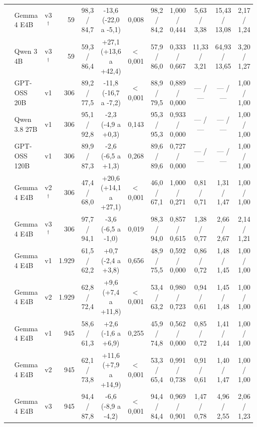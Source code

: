 \begin{table}[htbp!]
{\begin{tabular}{|l|l|c|r|c|c|c|c|c|c|c|c|}
 & Gemma 4 E4B & v3$^\dagger$ & 59 & 98,3 / 84,7 & -13,6 (-22,0 a -5,1) & 0,008 & 98,2 / 84,2 & 1,000 / 0,444 & 5,63 / 3,38 & 15,43 / 13,08 & 2,17 / 1,24 \\
 & Qwen 3 4B & v3$^\dagger$ & 59 & 59,3 / 86,4 & +27,1 (+13,6 a +42,4) & $<$\,0,001 & 57,9 / 86,0 & 0,333 / 0,667 & 11,33 / 3,21 & 64,93 / 13,65 & 3,20 / 1,27 \\
\hline
{} & GPT-OSS 20B & v1 & 306 & 89,2 / 77,5 & -11,8 (-16,7 a -7,2) & $<$\,0,001 & 88,9 / 79,5 & 0,889 / 0,000 & --- / --- & --- / --- & 1,00 / 1,00 \\
 & Qwen 3.8 27B & v1 & 306 & 95,1 / 92,8 & -2,3 (-4,9 a +0,3) & 0,143 & 95,3 / 95,3 & 0,933 / 0,000 & --- / --- & --- / --- & 1,00 / 1,00 \\
 & GPT-OSS 120B & v1 & 306 & 89,9 / 87,3 & -2,6 (-6,5 a +1,3) & 0,268 & 89,6 / 89,6 & 0,727 / 0,000 & --- / --- & --- / --- & 1,00 / 1,00 \\
\hline
{} & Gemma 4 E4B & v2$^\dagger$ & 306 & 47,4 / 68,0 & +20,6 (+14,1 a +27,1) & $<$\,0,001 & 46,0 / 67,1 & 1,000 / 0,271 & 0,81 / 0,71 & 1,31 / 1,47 & 1,00 / 1,00 \\
 & Gemma 4 E4B & v3$^\dagger$ & 306 & 97,7 / 94,1 & -3,6 (-6,5 a -1,0) & 0,019 & 98,3 / 94,0 & 0,857 / 0,615 & 1,38 / 0,77 & 2,66 / 2,67 & 2,14 / 1,21 \\
\hline
{} & Gemma 4 E4B & v1 & 1.929 & 61,5 / 62,2 & +0,7 (-2,4 a +3,8) & 0,656 & 48,9 / 75,5 & 0,592 / 0,000 & 0,86 / 0,72 & 1,48 / 1,45 & 1,00 / 1,00 \\
 & Gemma 4 E4B & v2 & 1.929 & 62,8 / 72,4 & +9,6 (+7,4 a +11,8) & $<$\,0,001 & 53,4 / 63,2 & 0,980 / 0,723 & 0,94 / 0,61 & 1,45 / 1,48 & 1,00 / 1,00 \\
\hline
{} & Gemma 4 E4B & v1 & 945 & 58,6 / 61,3 & +2,6 (-1,6 a +6,9) & 0,255 & 45,9 / 74,8 & 0,562 / 0,000 & 0,85 / 0,72 & 1,41 / 1,44 & 1,00 / 1,00 \\
 & Gemma 4 E4B & v2 & 945 & 62,1 / 73,8 & +11,6 (+7,9 a +14,9) & $<$\,0,001 & 53,3 / 65,4 & 0,991 / 0,738 & 0,91 / 0,61 & 1,40 / 1,47 & 1,00 / 1,00 \\
 & Gemma 4 E4B & v3 & 945 & 94,4 / 87,8 & -6,6 (-8,9 a -4,2) & $<$\,0,001 & 94,4 / 84,4 & 0,969 / 0,901 & 1,47 / 0,78 & 4,96 / 2,55 & 2,06 / 1,23 \\

\end{tabular}}
\end{table}
